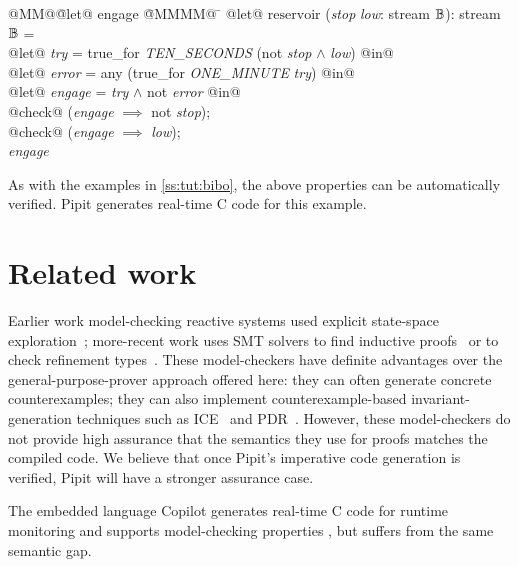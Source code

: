 \documentclass[sigplan,screen, review]{acmart}
\begin{document}
\newcommand\estop{\textit{stop}}
\newcommand\low{\textit{low}}
\newcommand\soltry{\textit{try}}
\newcommand\error{\textit{error}}
\newcommand\solen{\textit{engage}}
\begin{tabbing}
  @MM@\= @let@ engage \= @MMMM@ \= \kill
  @let@ $\mbox{reservoir}$ (\estop{} \low{}: stream $\mathbb{B}$): stream $\mathbb{B}$ = \\
  \> @let@ \soltry{} \> = true\_for \textit{TEN\_SECONDS} (not \estop{} $\wedge$ \low{}) @in@ \\
  \> @let@ \error{} \> = any (true\_for \textit{ONE\_MINUTE} \soltry{}) @in@ \\
  \> @let@ \solen{} \> = \soltry{} $\wedge$ not \error{} @in@ \\
  \> @check@ (\solen{} $\implies$ not \estop{}); \\
  \> @check@ (\solen{} $\implies$ \low{}); \\
  \> \solen{}
\end{tabbing}

As with the examples in \autoref{ss:tut:bibo}, the above properties can be automatically verified.
Pipit generates real-time C code for this example.

\section{Related work}

Earlier work model-checking reactive systems used explicit state-space exploration~\cite{raymond2008synchronous}; more-recent work uses SMT solvers to find inductive proofs~\cite{hagen2008scaling,champion2016kind2} or to check refinement types~\cite{chen2022synchronous}.
These model-checkers have definite advantages over the general-purpose-prover approach offered here: they can often generate concrete counterexamples; they can also implement counterexample-based invariant-generation techniques such as ICE~\cite{garg2014ice} and PDR~\cite{bradley2011sat,een2011efficient}.
However, these model-checkers do not provide high assurance that the semantics they use for proofs matches the compiled code.
We believe that once Pipit's imperative code generation is verified, Pipit will have a stronger assurance case.

The embedded language Copilot generates real-time C code for runtime monitoring and supports model-checking properties \cite{laurent2015assuring}, but suffers from the same semantic gap.
\end{document}
